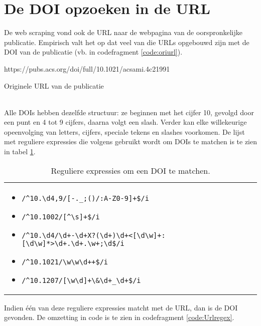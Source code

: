 \section{De DOI opzoeken in de URL}
\label{Doiurl}
De web scraping vond ook de URL naar de webpagina van de oorspronkelijke publicatie. Empirisch valt het op dat veel van die URLs opgebouwd zijn met de DOI van de publicatie (vb. in codefragment \ref{code:oriurl}).
\begin{listing}
    https://pubs.acs.org/doi/full/10.1021/acsami.4c21991
    \caption[URL met DOI]{Originele URL van de publicatie}
    \label{code:oriurl}
\end{listing}\\
Alle DOIs hebben dezelfde structuur: ze beginnen met het cijfer 10, gevolgd door een punt en 4 tot 9 cijfers, daarna volgt een slash. Verder kan elke willekeurige opeenvolging van letters, cijfers, speciale tekens en slashes voorkomen.
De lijst met reguliere expressies die volgens \textcite{CrossrefRegex2025} gebruikt wordt om DOIs te matchen is te zien in tabel \ref{table:regex}.
\begin{table}[h!]
    \begin{tabularx}{\linewidth}{|X|}
        \hline
        \begin{itemize}
            \item \texttt{/\textasciicircum10.\textbackslash d{4,9}/[-.\_;()/:A-Z0-9]+\$/i}
            \item \texttt{/\textasciicircum10.1002/[\textasciicircum\textbackslash s]+\$/i}
            \item \texttt{/\textasciicircum10.\textbackslash d{4}/\textbackslash d+-\textbackslash d+X?(\textbackslash d+)\textbackslash d+<[\textbackslash d\textbackslash w]+:[\textbackslash d\textbackslash w]*>\textbackslash d+.\textbackslash d+.\textbackslash w+;\textbackslash d\$/i}
            \item \texttt{/\textasciicircum10.1021/\textbackslash w\textbackslash w\textbackslash d++\$/i}
            \item \texttt{/\textasciicircum10.1207/[\textbackslash w\textbackslash d]+\textbackslash \&\textbackslash d+\_\textbackslash d+\$/i}
        \end{itemize}
        \hline
    \end{tabularx}
    \caption{Reguliere expressies om een DOI te matchen.}
    \label{table:regex}
\end{table}
Indien één van deze reguliere expressies matcht met de URL, dan is de DOI gevonden.
De omzetting in code is te zien in codefragment \ref{code:Urlregex}.
